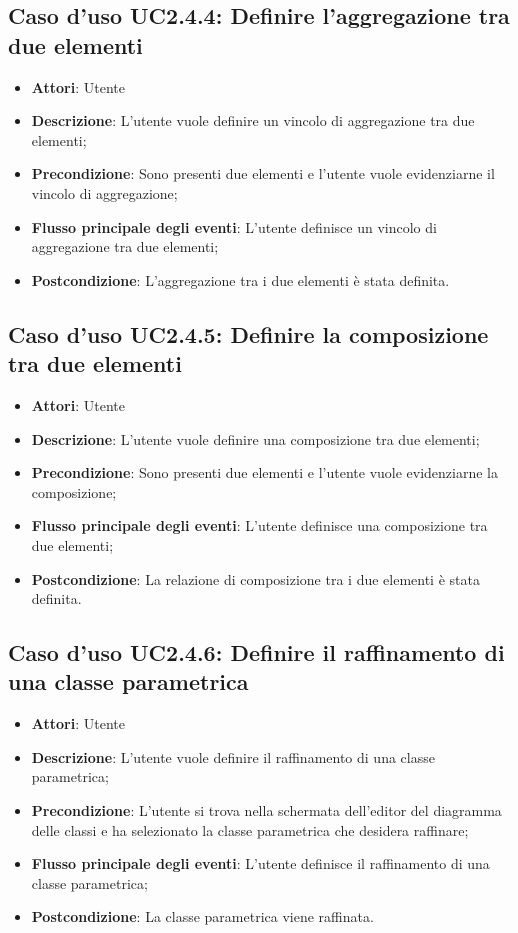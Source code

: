 \documentclass[../AnalisiDeiRequisiti.tex]{subfiles}
\begin{document}
		\subsection{Caso d'uso UC2.4.4: Definire l'aggregazione tra due elementi}
		\begin{itemize}
			\item \textbf{Attori}: Utente
			\item \textbf{Descrizione}: L'utente vuole definire un vincolo di aggregazione tra due elementi;
			\item \textbf{Precondizione}: Sono presenti due elementi e l'utente vuole evidenziarne il vincolo di aggregazione;
			\item \textbf{Flusso principale degli eventi}: L'utente definisce un vincolo di aggregazione tra due elementi;
			\item \textbf{Postcondizione}: L'aggregazione tra i due elementi è stata definita.
		\end{itemize}
		\subsection{Caso d'uso UC2.4.5: Definire la composizione tra due elementi}
		\begin{itemize}
			\item \textbf{Attori}: Utente
			\item \textbf{Descrizione}: L'utente vuole definire una composizione tra due elementi;
			\item \textbf{Precondizione}: Sono presenti due elementi e l'utente vuole evidenziarne la composizione;
			\item \textbf{Flusso principale degli eventi}: L'utente definisce una composizione tra due elementi;
			\item \textbf{Postcondizione}: La relazione di composizione tra i due elementi è stata definita.
		\end{itemize}
		\subsection{Caso d'uso UC2.4.6: Definire il raffinamento di una classe parametrica}
		\begin{itemize}
			\item \textbf{Attori}: Utente
			\item \textbf{Descrizione}: L'utente vuole definire il raffinamento di una classe parametrica;
			\item \textbf{Precondizione}: L'utente si trova nella schermata dell'editor del diagramma delle classi e ha selezionato la classe parametrica che desidera raffinare;
			\item \textbf{Flusso principale degli eventi}: L'utente definisce il raffinamento di una classe parametrica;
			\item \textbf{Postcondizione}: La classe parametrica viene raffinata.
		\end{itemize}
\end{document}
